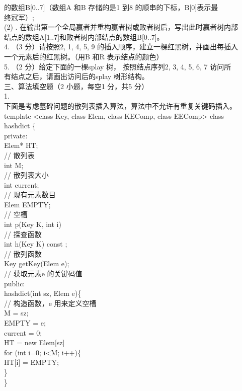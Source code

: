 \begin{question}
的数组B[0..7]（数组A 和B 存储的是1 到8 的顺串的下标，B[0]表示最\\
终冠军）;\\
(2) . 在输出第一个全局赢者并重构赢者树或败者树后，写出此时赢者树内部\\
结点的数组A[1..7]和败者树内部结点的数组B[0..7]。\\
4. （3 分）请按照2, 1, 4, 5, 9 的插入顺序，建立一棵红黑树，并画出每插入\\
一个元素后的红黑树。（用B 和R 表示结点的颜色）\\
5. （2 分）给定下面的一棵splay 树， 按照结点序列2, 3, 4, 5, 6, 7 访问所\\
有结点之后，请画出访问后的splay 树形结构。\\
三、算法填空题（2 小题，每空1 分，共5 分）\\
1.\\
下面是考虑墓碑问题的散列表插入算法，算法中不允许有重复关键码插入。\\
template <class Key, class Elem, class KEComp, class EEComp> class\\
hashdict  \{\\
private:\\
Elem* HT;\\
// 散列表\\
int M;\\
// 散列表大小\\
int currcnt;\\
// 现有元素数目\\
Elem EMPTY;\\
// 空槽\\
int p(Key K, int i)\\
// 探查函数\\
int h(Key K) const ;\\
// 散列函数\\
Key getKey(Elem e);\\
// 获取元素e 的关键码值\\
public:\\
hashdict(int sz, Elem e)\{\\
// 构造函数，e 用来定义空槽\\
M = sz;\\
EMPTY = e;\\
currcnt = 0;\\
HT = new Elem[sz]\\
for (int i=0; i<M; i++)\{\\
HT[i] = EMPTY;\\
\}\\
\}\\

\end{question}
